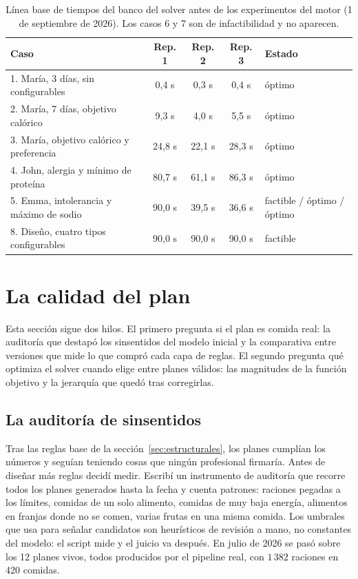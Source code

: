 \begin{table}[htbp]
\centering
\small
\begin{tabular}{|p{5.4cm}|c|c|c|p{3.2cm}|}
\hline
\textbf{Caso} & \textbf{Rep. 1} & \textbf{Rep. 2} & \textbf{Rep. 3} & \textbf{Estado} \\
\hline
1. María, 3 días, sin configurables & 0,4 s & 0,3 s & 0,4 s & óptimo \\
\hline
2. María, 7 días, objetivo calórico & 9,3 s & 4,0 s & 5,5 s & óptimo \\
\hline
3. María, objetivo calórico y preferencia & 24,8 s & 22,1 s & 28,3 s & óptimo \\
\hline
4. John, alergia y mínimo de proteína & 80,7 s & 61,1 s & 86,3 s & óptimo \\
\hline
5. Emma, intolerancia y máximo de sodio & 90,0 s & 39,5 s & 36,6 s & factible / óptimo / óptimo \\
\hline
8. Diseño, cuatro tipos configurables & 90,0 s & 90,0 s & 90,0 s & factible \\
\hline
\end{tabular}
\caption{Línea base de tiempos del banco del solver antes de los experimentos del motor (1 de septiembre de 2026). Los casos 6 y 7 son de infactibilidad y no aparecen.}
\label{tab:lineaBase}
\end{table}

\section{La calidad del plan}
\label{sec:evalCalidad}

Esta sección sigue dos hilos. El primero pregunta si el plan es comida real: la auditoría que destapó los sinsentidos del modelo inicial y la comparativa entre versiones que mide lo que compró cada capa de reglas. El segundo pregunta qué optimiza el solver cuando elige entre planes válidos: las magnitudes de la función objetivo y la jerarquía que quedó tras corregirlas.

\subsection{La auditoría de sinsentidos}
\label{sec:evalAuditoria}

Tras las reglas base de la sección~\ref{sec:estructurales}, los planes cumplían los números y seguían teniendo cosas que ningún profesional firmaría. Antes de diseñar más reglas decidí medir. Escribí un instrumento de auditoría que recorre todos los planes generados hasta la fecha y cuenta patrones: raciones pegadas a los límites, comidas de un solo alimento, comidas de muy baja energía, alimentos en franjas donde no se comen, varias frutas en una misma comida. Los umbrales que usa para señalar candidatos son heurísticos de revisión a mano, no constantes del modelo: el script mide y el juicio va después. En julio de 2026 se pasó sobre los 12 planes vivos, todos producidos por el pipeline real, con $1\,382$ raciones en 420 comidas.

